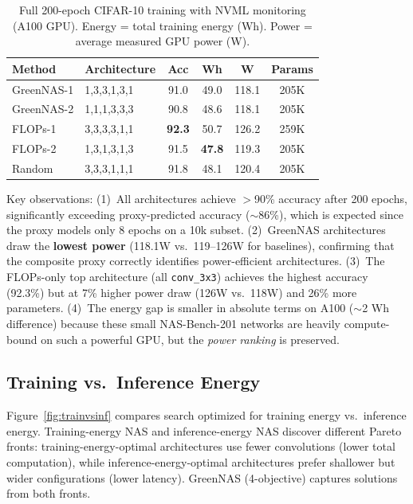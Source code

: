 \documentclass[10pt,twocolumn,letterpaper]{article}
\begin{document}
\begin{table}[t]
\centering
\caption{Full 200-epoch CIFAR-10 training with NVML monitoring (A100 GPU). Energy = total training energy (Wh). Power = average measured GPU power (W).}
\label{tab:topk}
\small
\begin{tabular}{@{}l l c c c c@{}}
\toprule
\textbf{Method} & \textbf{Architecture} & \textbf{Acc} & \textbf{Wh} & \textbf{W} & \textbf{Params} \\
\midrule
GreenNAS-1 & 1,3,3,1,3,1 & 91.0 & 49.0 & 118.1 & 205K \\
GreenNAS-2 & 1,1,1,3,3,3 & 90.8 & 48.6 & 118.1 & 205K \\
\midrule
FLOPs-1 & 3,3,3,3,1,1 & \textbf{92.3} & 50.7 & 126.2 & 259K \\
FLOPs-2 & 1,3,1,3,1,3 & 91.5 & \textbf{47.8} & 119.3 & 205K \\
\midrule
Random & 3,3,3,1,1,1 & 91.8 & 48.1 & 120.4 & 205K \\
\bottomrule
\end{tabular}
\end{table}

Key observations: (1)~All architectures achieve $>$90\% accuracy after 200 epochs, significantly exceeding proxy-predicted accuracy ($\sim$86\%), which is expected since the proxy models only 8 epochs on a 10k subset. (2)~GreenNAS architectures draw the \textbf{lowest power} (118.1W vs.\ 119--126W for baselines), confirming that the composite proxy correctly identifies power-efficient architectures. (3)~The FLOPs-only top architecture (all \texttt{conv\_3x3}) achieves the highest accuracy (92.3\%) but at 7\% higher power draw (126W vs.\ 118W) and 26\% more parameters. (4)~The energy gap is smaller in absolute terms on A100 ($\sim$2 Wh difference) because these small NAS-Bench-201 networks are heavily compute-bound on such a powerful GPU, but the \emph{power ranking} is preserved.

\subsection{Training vs.\ Inference Energy}

Figure~\ref{fig:trainvsinf} compares search optimized for training energy vs.\ inference energy. Training-energy NAS and inference-energy NAS discover different Pareto fronts: training-energy-optimal architectures use fewer convolutions (lower total computation), while inference-energy-optimal architectures prefer shallower but wider configurations (lower latency). GreenNAS (4-objective) captures solutions from both fronts.
\end{document}
